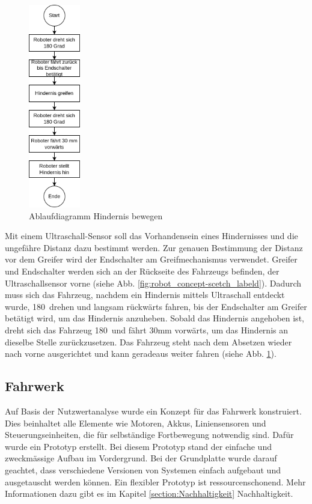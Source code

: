 \begin{figure}[H]
\centering
\includegraphics[width=0.2\textwidth]{assets/gesamtkonzept/ablaufdiagramm-hindernis-bewegen.png}
\caption{Ablaufdiagramm Hindernis bewegen}
\label{fig:ablaufdiagramm-hindernis-bewegen}
\end{figure}

 Mit einem Ultraschall-Sensor soll das Vorhandensein eines Hindernisses und die ungefähre Distanz dazu bestimmt werden. Zur genauen Bestimmung der Distanz vor dem Greifer wird der Endschalter am Greifmechanismus verwendet.
Greifer und Endschalter werden sich an der Rückseite des Fahrzeugs befinden, der Ultraschallsensor vorne (siehe Abb. \ref{fig:robot_concept-scetch_labeld}). Dadurch muss sich das Fahrzeug, nachdem ein Hindernis mittels Ultraschall entdeckt wurde, 180\textdegree\ drehen und langsam rückwärts fahren, bis der Endschalter am Greifer betätigt wird, um das Hindernis anzuheben. Sobald das Hindernis angehoben ist, dreht sich das Fahrzeug 180\textdegree\ und fährt 30mm vorwärts, um das Hindernis an dieselbe Stelle zurückzusetzen. Das Fahrzeug steht nach dem Absetzen wieder nach vorne ausgerichtet und kann geradeaus weiter fahren (siehe  Abb. \ref{fig:ablaufdiagramm-hindernis-bewegen}).


\subsection{Fahrwerk}

Auf Basis der Nutzwertanalyse wurde ein Konzept für das Fahrwerk konstruiert. Dies beinhaltet alle Elemente wie Motoren, Akkus, Liniensensoren und Steuerungseinheiten, die für selbständige Fortbewegung notwendig sind. Dafür wurde ein Prototyp erstellt. Bei diesem Prototyp stand der einfache und zweckmässige Aufbau im Vordergrund. Bei der Grundplatte wurde darauf geachtet, dass verschiedene  Versionen von Systemen einfach aufgebaut und ausgetauscht werden können. Ein flexibler Prototyp ist ressourcenschonend. Mehr Informationen dazu gibt es im Kapitel \ref{section:Nachhaltigkeit} Nachhaltigkeit. 

